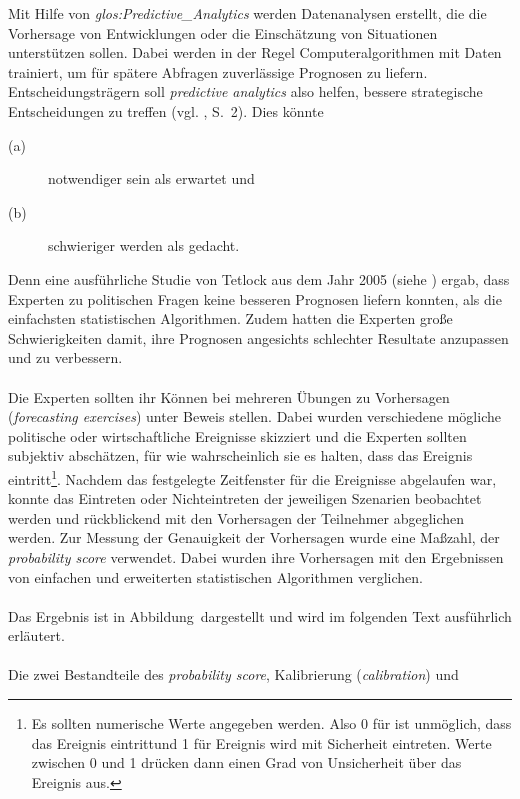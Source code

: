 Mit Hilfe von \emph{\gls{glos:Predictive_Analytics}} werden Datenanalysen
erstellt, die die Vorhersage von Entwicklungen oder die Einschätzung von
Situationen unterstützen sollen. Dabei werden in der Regel Computeralgorithmen
mit Daten trainiert, um für spätere Abfragen zuverlässige Prognosen zu liefern.
Entscheidungsträgern soll \emph{predictive analytics} also helfen, bessere
strategische Entscheidungen zu treffen (vgl. \cite{Mauerer}, S.~2). %
Dies könnte
\begin{description}
\item[(a)] notwendiger sein als erwartet und
\item[(b)] schwieriger werden als gedacht.
\end{description}
Denn eine ausführliche Studie von Tetlock aus dem Jahr 2005 (siehe
\cite{Tetlock}) ergab,
dass Experten zu politischen Fragen keine besseren Prognosen liefern konnten,
als die einfachsten statistischen Algorithmen. Zudem hatten die Experten
große Schwierigkeiten damit, ihre Prognosen angesichts schlechter Resultate
anzupassen und zu verbessern. \\ \\
Die Experten sollten ihr Können bei mehreren Übungen zu Vorhersagen
(\emph{forecasting exercises}) unter Beweis stellen. Dabei wurden verschiedene
mögliche politische oder wirtschaftliche Ereignisse skizziert und die Experten
sollten subjektiv abschätzen, für wie wahrscheinlich sie es halten, dass das
Ereignis eintritt\footnote{Es sollten numerische Werte angegeben werden. Also
0 für  ist unmöglich, dass das Ereignis eintritt\grqq und 1 für
 Ereignis wird mit Sicherheit eintreten\grqq. Werte zwischen 0 und 1
drücken dann einen Grad von Unsicherheit über das Ereignis aus.}.
Nachdem das festgelegte Zeitfenster für die Ereignisse abgelaufen war, konnte
das Eintreten oder Nichteintreten der jeweiligen Szenarien beobachtet werden und
rückblickend mit den Vorhersagen der Teilnehmer abgeglichen werden.  
Zur Messung der Genauigkeit der Vorhersagen wurde eine Maßzahl,
der \emph{probability score} verwendet. Dabei wurden ihre Vorhersagen mit den
Ergebnissen von einfachen und erweiterten statistischen Algorithmen
verglichen. \\ \\
Das Ergebnis ist in Abbildung~\xcom dargestellt und wird im folgenden Text
ausführlich erläutert. \\ \\
Die zwei
Bestandteile des \emph{probability score}, Kalibrierung (\emph{calibration}) und
